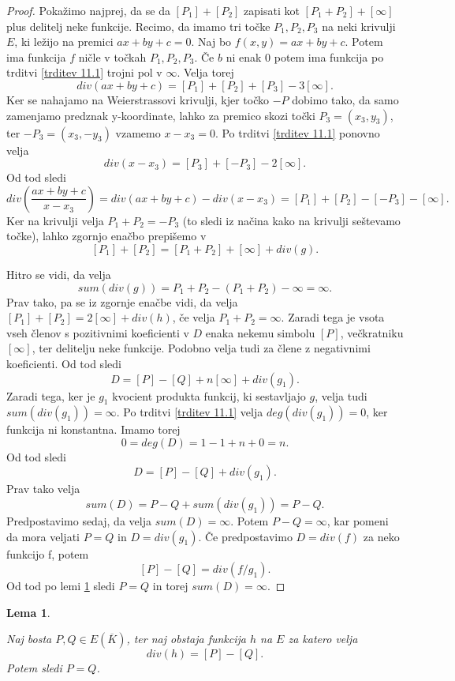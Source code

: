 \documentclass[12pt,a4paper,twoside]{article}
\theoremstyle{definition} %
\theoremstyle{plain} %
\newtheorem{lema}[definicija]{Lema}
\numberwithin{equation}{section}  %
\newcommand{\E}[1]{E({#1})}
\begin{document}
\begin{proof}

Pokažimo najprej, da se da $[P_1]+ [P_2]$ zapisati kot $[P_1+P_2] + [\infty]$ plus delitelj neke funkcije.
Recimo, da imamo tri točke $P_1,P_2,P_3$ na neki krivulji $E$, ki ležijo na premici $ax+by+c = 0$.
Naj bo $f(x,y) = ax+by+c$. Potem ima funkcija $f$ ničle v točkah $P_1,P_2,P_3$. Če $b$ ni enak $0$ potem ima funkcija po trditvi \ref{trditev 11.1} trojni pol v $\infty$.
Velja torej $$div(ax+by+c) = [P_1]+[P_2]+[P_3]-3[\infty].$$
Ker se nahajamo na Weierstrassovi krivulji, kjer točko $-P$ dobimo tako, da samo zamenjamo predznak y-koordinate, lahko za premico skozi točki $P_3 = (x_3,y_3)$, ter $-P_3=(x_3,-y_3)$ vzamemo $x-x_3=0$.
Po  trditvi \ref{trditev 11.1} ponovno velja
$$div(x-x_3) = [P_3]+[-P_3]-2[\infty].$$
Od tod sledi
$$div\left( \frac{ax+by+c}{x-x_3}\right) = div(ax+by+c) - div(x-x_3) =[P_1]+[P_2]-[-P_3]-[\infty].$$
Ker na krivulji velja $P_1+P_2 = -P_3$ (to sledi iz načina kako na krivulji seštevamo točke), lahko zgornjo enačbo prepišemo v 
$$[P_1]+[P_2] = [P_1+P_2]+[\infty]+div(g).$$ 


Hitro se vidi, da velja
$$sum(div(g))= P_1+P_2-(P_1+P_2)-\infty = \infty.$$
Prav tako, pa se iz zgornje enačbe vidi, da velja $[P_1]+[P_2] = 2[\infty] + div(h)$, če velja $P_1+P_2 = \infty$. Zaradi tega je vsota vseh členov s pozitivnimi koeficienti v $D$ enaka nekemu simbolu $[P]$, večkratniku $[\infty]$, ter delitelju neke funkcije. Podobno velja tudi za člene z negativnimi koeficienti. Od tod sledi
$$D = [P]-[Q]+n[\infty]+div(g_1).$$
Zaradi tega, ker je $g_1$ kvocient produkta funkcij, ki sestavljajo $g$, velja tudi
\newline $sum(div(g_1))= \infty$. Po trditvi \ref{trditev 11.1} velja $deg(div(g_1))=0$, ker funkcija ni konstantna. Imamo torej $$0 = deg(D) = 1-1+n+0=n.$$
Od tod sledi
$$D = [P]-[Q] + div(g_1).$$
Prav tako velja
$$sum(D) = P-Q+sum(div(g_1)) = P-Q.$$
Predpostavimo sedaj, da velja $sum(D) = \infty$. Potem $P-Q = \infty$, kar pomeni da mora veljati $P=Q$ in $D = div(g_1)$. Če predpostavimo $D = div(f)$ za neko funkcijo f, potem
$$[P]-[Q] = div(f/g_1).$$
Od tod po lemi \ref{lema 11.3} sledi $P = Q$ in torej $sum(D) = \infty$.

\end{proof}

\begin{lema}
\label{lema 11.3}

Naj bosta $P,Q \in \E{\overline{K}}$, ter naj obstaja funkcija $h$ na $E$ za katero velja
$$div(h)=[P]-[Q].$$
Potem sledi $P=Q$.
\end{lema}
\end{document}
